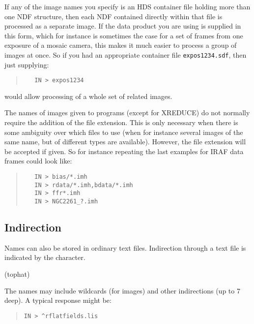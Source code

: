 \documentclass[twoside,11pt]{article}
\newcommand{\htmlref}[2]{#1}
\renewcommand{\_}{\texttt{\symbol{95}}}
\newenvironment{myquote}{\begin{quote}\begin{small}}{\end{small}\end{quote}}
\newcommand{\text}[1]{{\small \tt #1}}
\newcommand{\xroutine}[1]{\htmlref{{\sc #1}}{#1}}
\begin{document}
If any of the image names you specify is an HDS container file
holding more than one NDF structure, then each NDF contained directly 
within that file is processed as a separate image.  
If the data product you are using is supplied in this form, 
which for instance is sometimes the case for a set of frames 
from one exposure of a mosaic camera, 
this makes it much easier to process a group of images at once.
So if you had an 
appropriate container file \text{expos1234.sdf}, then just supplying:
\begin{myquote}
\begin{verbatim}
   IN > expos1234
\end{verbatim}
\end{myquote}
would allow processing of a whole set of related images.

The names of images given to programs (except for \xroutine{XREDUCE})
do not normally require the addition of the file extension. This
is only necessary when there is some ambiguity over which files to
use (when for instance several images of the same name, but of
different types are available). However, the file extension will
be accepted if given. So for instance repeating the last examples
for IRAF data frames could look like:
\begin{myquote}
\begin{verbatim}
   IN > bias/*.imh
   IN > rdata/*.imh,bdata/*.imh
   IN > ffr*.imh
   IN > NGC2261_?.imh
\end{verbatim}
\end{myquote}

\subsection{Indirection}
Names can also be stored in ordinary text files. Indirection through a
text file is indicated by the character.

\begin{description}
   \item \hspace{13pt}{\bf$^\wedge$}\hspace{3ex}   (tophat)
\end{description}

The names may include wildcards (for images) and other indirections (up to
7 deep). A typical response might be:
\begin{myquote}
\begin{verbatim}
IN > ^rflatfields.lis
\end{verbatim}
\end{myquote}
\end{document}
